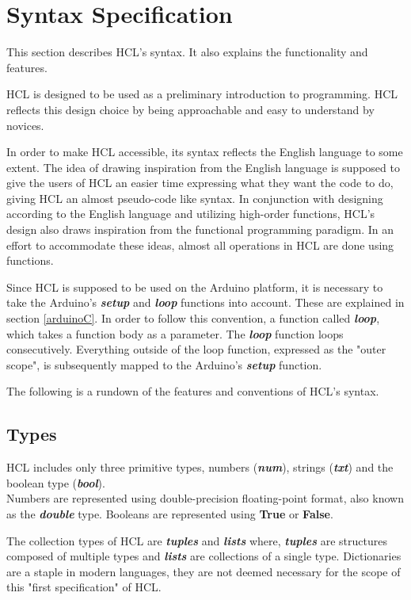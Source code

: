 \section{Syntax Specification}
This section describes HCL's syntax.
It also explains the functionality and features.

HCL is designed to be used as a preliminary introduction to programming.
HCL reflects this design choice by being approachable and easy to understand by novices.

In order to make HCL accessible, its syntax reflects the English language to some extent.
The idea of drawing inspiration from the English language is supposed to give the users of HCL an easier time expressing what they want the code to do, giving HCL an almost pseudo-code like syntax.
In conjunction with designing according to the English language and utilizing high-order functions, HCL's design also draws inspiration from the functional programming paradigm.
In an effort to accommodate these ideas, almost all operations in HCL are done using functions. 

Since HCL is supposed to be used on the Arduino platform, it is necessary to take the Arduino's \textbf{\textit{setup}} and \textbf{\textit{loop}} functions into account. 
These are explained in section \ref{arduinoC}.
In order to follow this convention, a function called \textbf{\textit{loop}}, which takes a function body as a parameter.
The \textbf{\textit{loop}} function loops consecutively.
Everything outside of the loop function, expressed as the "outer scope", is subsequently mapped to the Arduino's \textbf{\textit{setup}} function.

The following is a rundown of the features and conventions of HCL's syntax.

\subsection{Types}
HCL includes only three primitive types, numbers (\textbf{\textit{num}}), strings (\textbf{\textit{txt}}) and the boolean type (\textbf{\textit{bool}}).\\
Numbers are represented using double-precision floating-point format, also known as the \textbf{\textit{double}} type.
Booleans are represented using \textbf{True} or \textbf{False}.

The collection types of HCL are \textbf{\textit{tuples}} and \textbf{\textit{lists}} where, 
\textbf{\textit{tuples}} are structures composed of multiple types and \textbf{\textit{lists}} are collections of a single type.
Dictionaries are a staple in modern languages, they are not deemed necessary for the scope of this "first specification" of HCL.

